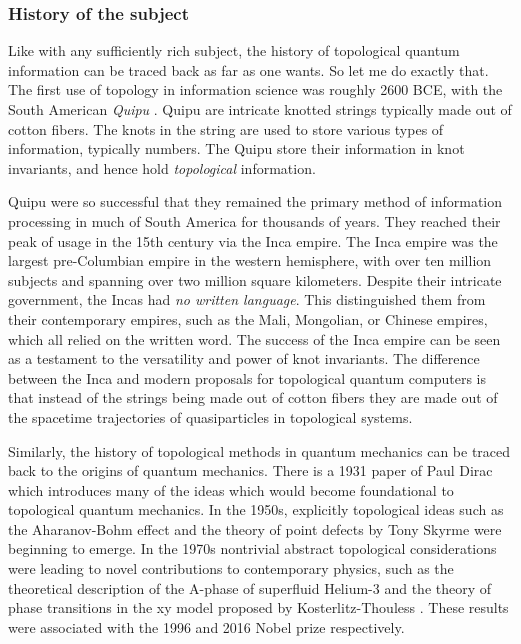 \documentclass{article}
\theoremstyle{definition}
\numberwithin{figure}{section}
\begin{document}
\subsubsection{History of the subject}

Like with any sufficiently rich subject, the history of topological quantum information can be traced back as far as one wants. So let me do exactly that. The first use of topology in information science was roughly 2600 BCE, with the South American \textit{Quipu} \cite{ascher1981code}. Quipu are intricate knotted strings typically made out of cotton fibers. The knots in the string are used to store various types of information, typically numbers. The Quipu store their information in knot invariants, and hence hold \textit{topological} information.

Quipu were so successful that they remained the primary method of information processing in much of South America for thousands of years. They reached their peak of usage in the 15th century via the Inca empire. The Inca empire was the largest pre-Columbian empire in the western hemisphere, with over ten million subjects and spanning over two million square kilometers. Despite their intricate government, the Incas had \textit{no written language}. This distinguished them from their contemporary empires, such as the Mali, Mongolian, or Chinese empires, which all relied on the written word. The success of the Inca empire can be seen as a testament to the versatility and power of knot invariants. The difference between the Inca and modern proposals for topological quantum computers is that instead of the strings being made out of cotton fibers they are made out of the spacetime trajectories of quasiparticles in topological systems.

Similarly, the history of topological methods in quantum mechanics can be traced back to the origins of quantum mechanics. There is a 1931 paper of Paul Dirac \cite{dirac1931quantised} which introduces many of the ideas which would become foundational to topological quantum mechanics. In the 1950s, explicitly topological ideas such as the Aharanov-Bohm effect \cite{aharonov1959significance} and the theory of point defects by Tony Skyrme \cite{skyrme1962unified} were beginning to emerge. In the 1970s nontrivial abstract topological considerations were leading to novel contributions to contemporary physics, such as the theoretical description of the A-phase of superfluid Helium-3 \cite{anderson1977phase} and the theory of phase transitions in the xy model proposed by Kosterlitz-Thouless \cite{kosterlitz1973ordering}. These results were associated with the 1996 and 2016 Nobel prize respectively.
\end{document}
